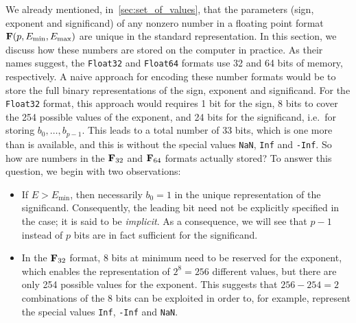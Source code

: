 We already mentioned, in~\cref{sec:set_of_values},
that the parameters (sign, exponent and significand) of any nonzero number in a floating point format $\mathbf F(p, E_{\min}, E_{\max})$ are unique in the standard representation.
In this section,
we discuss how these numbers are stored on the computer in practice.
As their names suggest, the \texttt{Float32} and \texttt{Float64} formats use 32 and 64 bits of memory, respectively.
A naive approach for encoding these number formats would be to store the full binary representations of the sign, exponent and significand.
For the \texttt{Float32} format,
this approach would requires 1 bit for the sign,
8 bits to cover the 254 possible values of the exponent, and 24 bits for the significand,
i.e.\ for storing $b_0, \dots, b_{p-1}$.
This leads to a total number of 33 bits,
which is one more than is available,
and this is without the special values \texttt{NaN}, \texttt{Inf} and \texttt{-Inf}.
So how are numbers in the $\mathbf F_{32}$ and $\mathbf F_{64}$ formats actually stored?
To answer this question,
we begin with two observations:
\begin{itemize}
    \item
        If $E > E_{\min}$,
        then necessarily $b_0 = 1$ in the unique representation of the significand.
        Consequently, the leading bit need not be explicitly specified in the case;
        it is said to be \emph{implicit}.
        As a consequence,
        we will see that $p-1$ instead of $p$ bits are in fact sufficient for the significand.
    \item
        In the $\mathbf F_{32}$ format,
        8 bits at minimum need to be reserved for the exponent,
        which enables the representation of $2^8 = 256$ different values,
        but there are only 254 possible values for the exponent.
        This suggests that $256 - 254 = 2$ combinations of the 8 bits can be exploited in order to,
        for example, represent the special values \texttt{Inf}, \texttt{-Inf} and \texttt{NaN}.
\end{itemize}

